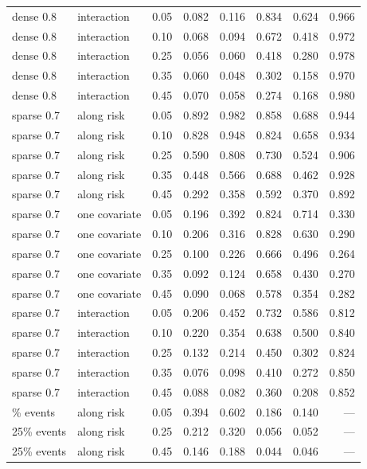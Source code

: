 \begin{table}[htbp]
\begin{tabular}{lllrrrrr}
\addlinespace
dense 0.8 & interaction & 0.05 & 0.082 & 0.116 & 0.834 & 0.624 & 0.966 \\
dense 0.8 & interaction & 0.10 & 0.068 & 0.094 & 0.672 & 0.418 & 0.972 \\
dense 0.8 & interaction & 0.25 & 0.056 & 0.060 & 0.418 & 0.280 & 0.978 \\
dense 0.8 & interaction & 0.35 & 0.060 & 0.048 & 0.302 & 0.158 & 0.970 \\
dense 0.8 & interaction & 0.45 & 0.070 & 0.058 & 0.274 & 0.168 & 0.980 \\
\addlinespace
sparse 0.7 & along risk & 0.05 & 0.892 & 0.982 & 0.858 & 0.688 & 0.944 \\
sparse 0.7 & along risk & 0.10 & 0.828 & 0.948 & 0.824 & 0.658 & 0.934 \\
sparse 0.7 & along risk & 0.25 & 0.590 & 0.808 & 0.730 & 0.524 & 0.906 \\
sparse 0.7 & along risk & 0.35 & 0.448 & 0.566 & 0.688 & 0.462 & 0.928 \\
sparse 0.7 & along risk & 0.45 & 0.292 & 0.358 & 0.592 & 0.370 & 0.892 \\
\addlinespace
sparse 0.7 & one covariate & 0.05 & 0.196 & 0.392 & 0.824 & 0.714 & 0.330 \\
sparse 0.7 & one covariate & 0.10 & 0.206 & 0.316 & 0.828 & 0.630 & 0.290 \\
sparse 0.7 & one covariate & 0.25 & 0.100 & 0.226 & 0.666 & 0.496 & 0.264 \\
sparse 0.7 & one covariate & 0.35 & 0.092 & 0.124 & 0.658 & 0.430 & 0.270 \\
sparse 0.7 & one covariate & 0.45 & 0.090 & 0.068 & 0.578 & 0.354 & 0.282 \\
\addlinespace
sparse 0.7 & interaction & 0.05 & 0.206 & 0.452 & 0.732 & 0.586 & 0.812 \\
sparse 0.7 & interaction & 0.10 & 0.220 & 0.354 & 0.638 & 0.500 & 0.840 \\
sparse 0.7 & interaction & 0.25 & 0.132 & 0.214 & 0.450 & 0.302 & 0.824 \\
sparse 0.7 & interaction & 0.35 & 0.076 & 0.098 & 0.410 & 0.272 & 0.850 \\
sparse 0.7 & interaction & 0.45 & 0.088 & 0.082 & 0.360 & 0.208 & 0.852 \\
\addlinespace
25\% events & along risk & 0.05 & 0.394 & 0.602 & 0.186 & 0.140 & --- \\
25\% events & along risk & 0.25 & 0.212 & 0.320 & 0.056 & 0.052 & --- \\
25\% events & along risk & 0.45 & 0.146 & 0.188 & 0.044 & 0.046 & --- \\

\end{tabular}
\end{table}
